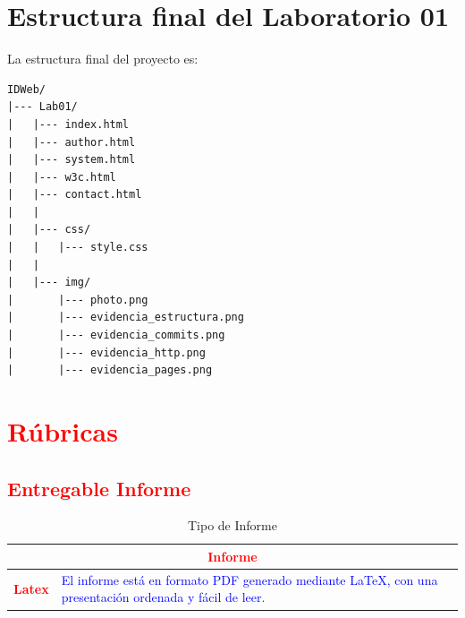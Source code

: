 \documentclass{article}
\begin{document}

\section{Estructura final del Laboratorio 01}

La estructura final del proyecto es:

\begin{lstlisting}[style=ascii-tree]
IDWeb/
|--- Lab01/
|   |--- index.html
|   |--- author.html
|   |--- system.html
|   |--- w3c.html
|   |--- contact.html
|   |
|   |--- css/
|   |   |--- style.css
|   |
|   |--- img/
|       |--- photo.png
|       |--- evidencia_estructura.png
|       |--- evidencia_commits.png
|       |--- evidencia_http.png
|       |--- evidencia_pages.png
\end{lstlisting}


\section{\textcolor{red}{Rúbricas}}

\subsection{\textcolor{red}{Entregable Informe}}

\begin{table}[H]

\caption{Tipo de Informe}

\setlength{\tabcolsep}{0.5em}

{\renewcommand{\arraystretch}{1.5}

\begin{tabular}{|p{3cm}|p{12cm}|}

\hline

\multicolumn{2}{|c|}{\textbf{\textcolor{red}{Informe}}}

\\
\hline

\textbf{\textcolor{red}{Latex}}
&
\textcolor{blue}{
El informe está en formato PDF generado mediante
LaTeX, con una presentación ordenada y fácil de leer.
}

\\
\hline

\end{tabular}

}

\end{table}
\end{document}
